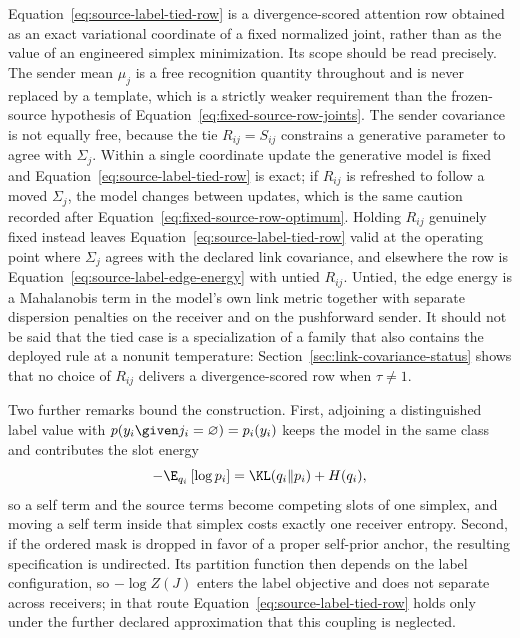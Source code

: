 Equation~\eqref{eq:source-label-tied-row} is a divergence-scored attention row obtained as an exact variational coordinate of a fixed normalized joint, rather than as the value of an engineered simplex minimization. Its scope should be read precisely. The sender mean \(\mu_j\) is a free recognition quantity throughout and is never replaced by a template, which is a strictly weaker requirement than the frozen-source hypothesis of Equation~\eqref{eq:fixed-source-row-joints}. The sender covariance is not equally free, because the tie \(R_{ij}=S_{ij}\) constrains a generative parameter to agree with \(\Sigma_j\). Within a single coordinate update the generative model is fixed and Equation~\eqref{eq:source-label-tied-row} is exact; if \(R_{ij}\) is refreshed to follow a moved \(\Sigma_j\), the model changes between updates, which is the same caution recorded after Equation~\eqref{eq:fixed-source-row-optimum}. Holding \(R_{ij}\) genuinely fixed instead leaves Equation~\eqref{eq:source-label-tied-row} valid at the operating point where \(\Sigma_j\) agrees with the declared link covariance, and elsewhere the row is Equation~\eqref{eq:source-label-edge-energy} with untied \(R_{ij}\). Untied, the edge energy is a Mahalanobis term in the model's own link metric together with separate dispersion penalties on the receiver and on the pushforward sender. It should not be said that the tied case is a specialization of a family that also contains the deployed rule at a nonunit temperature: Section~\ref{sec:link-covariance-status} shows that no choice of \(R_{ij}\) delivers a divergence-scored row when \(\tau\neq1\).

Two further remarks bound the construction. First, adjoining a distinguished label value with \(p(y_i\given j_i=\varnothing)=p_i(y_i)\) keeps the model in the same class and contributes the slot energy
\begin{equation}
-\E_{q_i}\left[\log p_i\right]=\KL(q_i\Vert p_i)+H(q_i),
\label{eq:source-label-self-slot}
\end{equation}
so a self term and the source terms become competing slots of one simplex, and moving a self term inside that simplex costs exactly one receiver entropy. Second, if the ordered mask is dropped in favor of a proper self-prior anchor, the resulting specification is undirected. Its partition function then depends on the label configuration, so \(-\log Z(J)\) enters the label objective and does not separate across receivers; in that route Equation~\eqref{eq:source-label-tied-row} holds only under the further declared approximation that this coupling is neglected.

